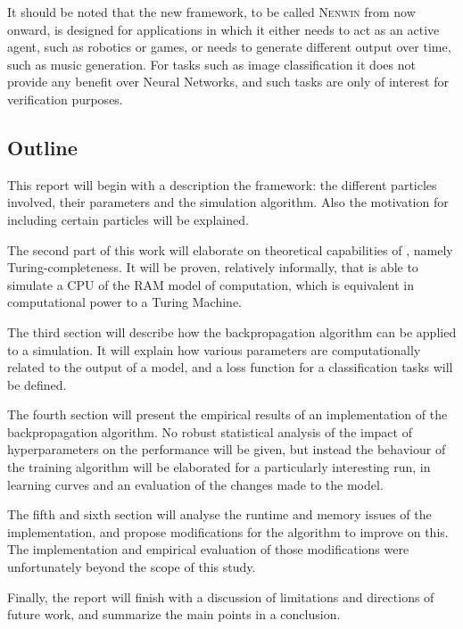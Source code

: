 It should be noted that the new framework, to be called \textsc{Nenwin} from now onward, 
is designed for applications in which it either needs to act as an active agent, 
such as robotics or games, 
or needs to generate different output over time, 
such as music generation. 
For tasks such as image classification it does not provide any benefit over Neural Networks, 
and such tasks are only of interest for verification purposes.

\subsection{Outline}
This report will begin with a description the \nenwin framework: 
the different particles involved, their parameters and the simulation algorithm. 
Also the motivation for including certain particles will be explained.

The second part of this work will elaborate on theoretical capabilities of \nenwin, namely Turing-completeness.
It will be proven, relatively informally, that \nenwin is able to simulate a CPU of the RAM model of computation,
which is equivalent in computational power to a Turing Machine.

The third section will describe how the backpropagation algorithm can be applied to a \nenwin simulation.
It will explain how various parameters are computationally related to the output of a \nenwin model,
and a loss function for a classification tasks will be defined.

The fourth section will present the empirical results of an implementation of the backpropagation algorithm.
No robust statistical analysis of the impact of hyperparameters on the performance will be given,
but instead the behaviour of the training algorithm will be elaborated for a particularly interesting run,
in learning curves and an evaluation of the changes made to the model.

The fifth and sixth section will analyse the runtime and memory issues of the implementation, 
and propose modifications for the algorithm to improve on this.
The implementation and empirical evaluation of those modifications were
unfortunately beyond the scope of this study.

Finally, the report will finish with a discussion of limitations and directions of future work,
and summarize the main points in a conclusion.


